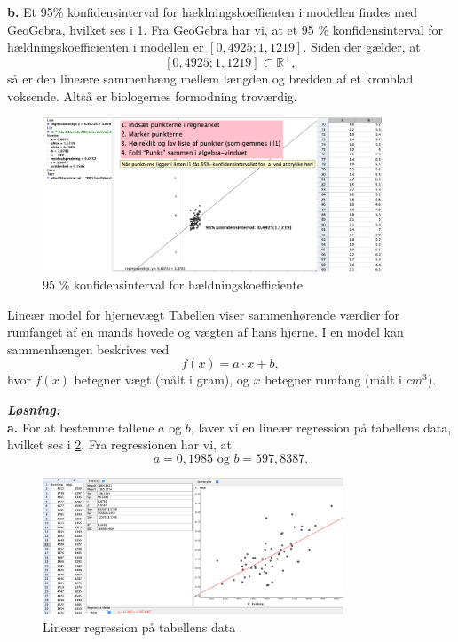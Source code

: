 \documentclass{article}
\newcommand{\sol}{\setlength{\parindent}{0cm}\textbf{\textit{Løsning:}}\setlength{\parindent}{1cm}}
\begin{document}
\noindent\textbf{b.}
Et 95\% konfidensinterval for hældningskoeffienten i modellen findes med GeoGebra, hvilket ses i \cref{fig:konfidens}.
Fra GeoGebra har vi, at et 95 \% konfidensinterval for hældningskoefficienten i modellen er $[0,4925;1,1219]$.
Siden der gælder, at 
\[
[0,4925 ; 1,1219] \subset \mathbb{R}^+,
\] 
så er den lineære sammenhæng mellem længden og bredden af et kronblad voksende.
Altså er biologernes formodning troværdig.

\begin{figure}[H]
\begin{center}
  \includegraphics[width=0.9\textwidth]{konfidens.png}
\end{center}
\caption{95 \% konfidensinterval for hældningskoefficiente}
\label{fig:konfidens}
\end{figure}

\begin{question}{Lineær model for hjernevægt}{}
  Tabellen viser sammenhørende værdier for rumfanget af en mands hovede og vægten af hans hjerne.
  I en model kan sammenhængen beskrives ved
  \[
  f(x)= a \cdot x + b,
  \] 
  hvor $f(x)$ betegner vægt (målt i gram), og $x$ betegner rumfang (målt i $\unit{cm^3}$).
\end{question}
\sol \\
\textbf{a.}
For at bestemme tallene $a$ og $b$, laver vi en lineær regression på tabellens data, hvilket ses i \cref{fig:rumfangregression}.
Fra regressionen har vi, at
\[
a=0,1985 \text{ og } b=597,8387.
\] 
\begin{figure}[H]
\begin{center}
  \includegraphics[width=0.8\textwidth]{rumfangregression.png}
\end{center}
\caption{Lineær regression på tabellens data}
\label{fig:rumfangregression}
\end{figure}
\end{document}
